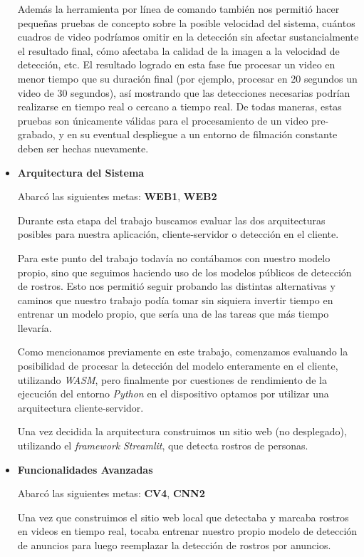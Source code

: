 \documentclass[a4paper]{article}
\begin{document}
\begin{itemize}
Además la herramienta por línea de comando también nos permitió hacer pequeñas pruebas de concepto sobre la posible velocidad del sistema, cuántos cuadros de video podríamos omitir en la detección sin afectar sustancialmente el resultado final, cómo afectaba la calidad de la imagen a la velocidad de detección, etc. El resultado logrado en esta fase fue procesar un video en menor tiempo que su duración final (por ejemplo, procesar en 20 segundos un video de 30 segundos), así mostrando que las detecciones necesarias podrían realizarse en tiempo real o cercano a tiempo real. De todas maneras, estas pruebas son únicamente válidas para el procesamiento de un video pre-grabado, y en su eventual despliegue a un entorno de filmación constante deben ser hechas nuevamente.

\item \textbf{Arquitectura del Sistema}

Abarcó las siguientes metas: \textbf{WEB1}, \textbf{WEB2} \medskip

Durante esta etapa del trabajo buscamos evaluar las dos arquitecturas posibles para nuestra aplicación, cliente-servidor o detección en el cliente.

Para este punto del trabajo todavía no contábamos con nuestro modelo propio, sino que seguimos haciendo uso de los modelos públicos de detección de rostros. Esto nos permitió seguir probando las distintas alternativas y caminos que nuestro trabajo podía tomar sin siquiera invertir tiempo en entrenar un modelo propio, que sería una de las tareas que más tiempo llevaría.

Como mencionamos previamente en este trabajo, comenzamos evaluando la posibilidad de procesar la detección del modelo enteramente en el cliente, utilizando \textit{WASM}, pero finalmente por cuestiones de rendimiento de la ejecución del entorno \textit{Python} en el dispositivo optamos por utilizar una arquitectura cliente-servidor.

Una vez decidida la arquitectura construimos un sitio web (no desplegado), utilizando el \textit{framework} \textit{Streamlit}, que detecta rostros de personas.

\item \textbf{Funcionalidades Avanzadas}

Abarcó las siguientes metas: \textbf{CV4}, \textbf{CNN2} \medskip

Una vez que construimos el sitio web local que detectaba y marcaba rostros en videos en tiempo real, tocaba entrenar nuestro propio modelo de detección de anuncios para luego reemplazar la detección de rostros por anuncios.


\end{itemize}
\end{document}
